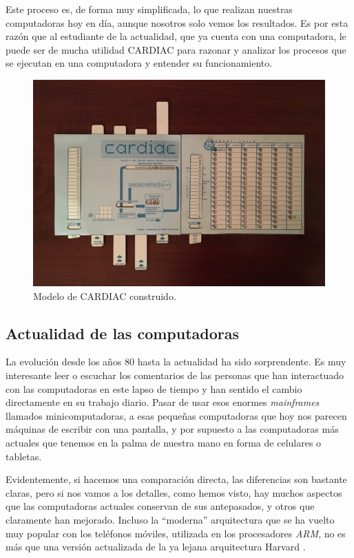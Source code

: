 \documentclass[letterpaper,12pt,oneside]{book}
\begin{document}
  
        Este proceso es, de forma muy simplificada,
		lo que realizan nuestras computadoras hoy en día, aunque nosotros solo vemos los resultados. Es por esta 
		razón que al estudiante de la actualidad, que ya cuenta con una computadora, le puede ser de mucha utilidad
		CARDIAC para razonar y analizar los procesos que se ejecutan en una computadora y entender su funcionamiento.

		\begin{figure}[h]
		\centering
			\includegraphics[scale=0.75]{media/CARDIAC_Paper/Construida.jpg}
			\caption{Modelo de CARDIAC construido.}
			\label{fig:CARDIAC_Construida}
		\end{figure}

		\clearpage		

	
		\subsection{Actualidad de las computadoras}
		
		La evolución desde los años 80 hasta la actualidad ha sido sorprendente. Es muy interesante leer o escuchar los comentarios de las personas que han interactuado
		con las computadoras en este lapso de tiempo y han sentido el cambio directamente en su trabajo diario. Pasar de usar esos enormes \textit{mainframes}
		llamados minicomputadoras, a esas pequeñas computadoras que hoy nos parecen  máquinas de escribir con una pantalla, y por supuesto a las 
		computadoras más actuales que tenemos en la palma de nuestra mano en forma de celulares o tabletas.
  
  
        Evidentemente, si hacemos una comparación directa, las diferencias
		son bastante claras, pero si nos vamos a los detalles, como hemos visto, hay muchos aspectos que las computadoras actuales conservan de sus antepasados, y otros que claramente
		han mejorado. Incluso la ``moderna''  arquitectura  que se ha vuelto muy popular con los teléfonos móviles, utilizada en los procesadores \textit{ARM}, no es más que una versión actualizada de la ya lejana arquitectura Harvard  \cite[p. 109]{valvano_introduction_2017}.
  
\end{document}
